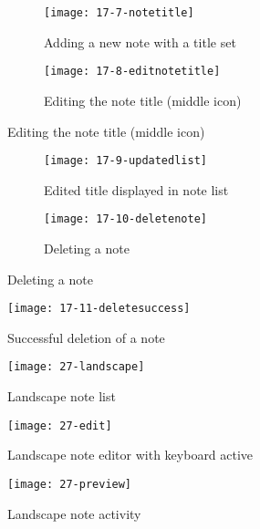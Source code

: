 \begin{figure}[H]
  \begin{subfigure}{.5\textwidth}
    \caption{Adding a new note with a title set}
    \centering
    \texttt{[image: 17-7-notetitle]}
  \end{subfigure}
  \begin{subfigure}{.5\textwidth}
    \caption{Editing the note title (middle icon)}
    \centering
    \texttt{[image: 17-8-editnotetitle]}
  \end{subfigure}
\end{figure}

\begin{figure}[H]
  \begin{subfigure}{.5\textwidth}
    \caption{Edited title displayed in note list}
    \centering
    \texttt{[image: 17-9-updatedlist]}
  \end{subfigure}
  \begin{subfigure}{.5\textwidth}
    \caption{Deleting a note}
    \centering
    \texttt{[image: 17-10-deletenote]}
  \end{subfigure}
\end{figure}

\begin{figure}[H]
  \caption{Successful deletion of a note}
  \centering
  \texttt{[image: 17-11-deletesuccess]}
\end{figure}

\begin{figure}[H]
  \caption{Landscape note list}
  \centering
  \texttt{[image: 27-landscape]}
\end{figure}

\begin{figure}[H]
  \caption{Landscape note editor with keyboard active}
  \centering
  \texttt{[image: 27-edit]}
\end{figure}

\begin{figure}[H]
  \caption{Landscape note activity}
  \centering
  \texttt{[image: 27-preview]}
\end{figure}
